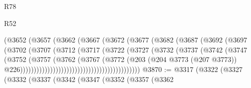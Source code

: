 \begin{lexlean}{R78}
\begin{lexlean}{R52}
\begin{coremodule}
{{{{{{{{{{{{{{{{{{{{{{{{{{{{{{{{{{{{{{{{{{{{{{{{{{{{{{{{{{{{{{{{{{{{{{{{{{{{{{{{{{{{{{{{{{{{{{{{{{{{{{{{{{{{{{{{{{{{{{{{{{{{{{{{{{{{{{{{{{{{{{{{{{{{{{{{{{{{{{{{{{{{{{{{{{{{{{{{{{{{{{{{{{{{{{{{{{{{{{                                        (@3652
                                          (@3657
                                            (@3662
                                              (@3667
                                                (@3672
                                                  (@3677
                                                    (@3682
                                                      (@3687
                                                        (@3692
                                                          (@3697
                                                            (@3702
                                                              (@3707
                                                                (@3712
                                                                  (@3717
                                                                    (@3722
                                                                      (@3727
                                                                        (@3732
                                                                          (@3737
                                                                            (@3742
                                                                              (@3747
                                                                                (@3752
                                                                                  (@3757
                                                                                    (@3762
                                                                                      (@3767
                                                                                        (@3772
                                                                                          (@203
                                                                                            (@204
                                                                                              @3773
                                                                                              (@207
                                                                                                @3773))
                                                                                            @226))))))))))))))))))))))))))))))))))))))))))))
@3870 := @3317
    (@3322
      (@3327
        (@3332
          (@3337
            (@3342
              (@3347
                (@3352
                  (@3357
                    (@3362
}}}}}}}}}}}}}}}}}}}}}}}}}}}}}}}}}}}}}}}}}}}}}}}}}}}}}}}}}}}}}}}}}}}}}}}}}}}}}}}}}}}}}}}}}}}}}}}}}}}}}}}}}}}}}}}}}}}}}}}}}}}}}}}}}}}}}}}}}}}}}}}}}}}}}}}}}}}}}}}}}}}}}}}}}}}}}}}}}}}}}}}}}}}}}}}}}}}}}}
\end{coremodule}
\end{lexlean}
\end{lexlean}
